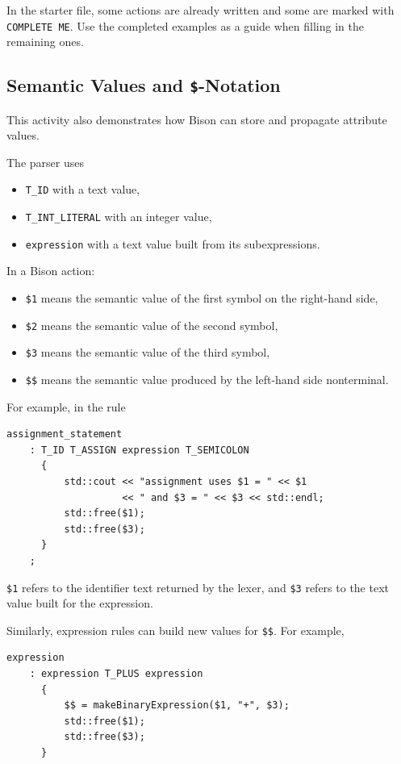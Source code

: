 \documentclass[12pt]{article}
\begin{document}
In the starter file, some actions are already written and some are marked with \texttt{COMPLETE ME}. Use the completed examples as a guide when filling in the remaining ones.

\subsection*{Semantic Values and \texttt{\$}-Notation}

This activity also demonstrates how Bison can store and propagate attribute values.

The parser uses
\begin{itemize}
    \item \texttt{T\_ID} with a text value,
    \item \texttt{T\_INT\_LITERAL} with an integer value,
    \item \texttt{expression} with a text value built from its subexpressions.
\end{itemize}

In a Bison action:
\begin{itemize}
    \item \texttt{\$1} means the semantic value of the first symbol on the right-hand side,
    \item \texttt{\$2} means the semantic value of the second symbol,
    \item \texttt{\$3} means the semantic value of the third symbol,
    \item \texttt{\$\$} means the semantic value produced by the left-hand side nonterminal.
\end{itemize}

For example, in the rule

\begin{lstlisting}
assignment_statement
    : T_ID T_ASSIGN expression T_SEMICOLON
      {
          std::cout << "assignment uses $1 = " << $1
                    << " and $3 = " << $3 << std::endl;
          std::free($1);
          std::free($3);
      }
    ;
\end{lstlisting}

\texttt{\$1} refers to the identifier text returned by the lexer, and \texttt{\$3} refers to the text value built for the expression.

Similarly, expression rules can build new values for \texttt{\$\$}. For example,

\begin{lstlisting}
expression
    : expression T_PLUS expression
      {
          $$ = makeBinaryExpression($1, "+", $3);
          std::free($1);
          std::free($3);
      }
\end{lstlisting}
\end{document}
